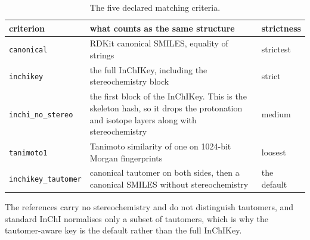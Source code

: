 \begin{table}[h]
\centering\small
\begin{threeparttable}
\caption{The five declared matching criteria.}
\label{tab:si-criteria}
\begin{tabular}{lp{7.2cm}l}
\toprule
criterion & what counts as the same structure & strictness \\
\midrule
\texttt{canonical} & RDKit canonical SMILES, equality of strings & strictest \\
\texttt{inchikey} & the full InChIKey, including the stereochemistry block & strict \\
\texttt{inchi\_no\_stereo} & the first block of the InChIKey. This is the skeleton hash, so it drops the protonation and isotope layers along with stereochemistry & medium \\
\texttt{tanimoto1} & Tanimoto similarity of one on 1024-bit Morgan fingerprints & loosest \\
\texttt{inchikey\_tautomer} & canonical tautomer on both sides, then a canonical SMILES without stereochemistry & the default \\
\bottomrule
\end{tabular}
\begin{tablenotes}[flushleft]\footnotesize
\item The references carry no stereochemistry and do not distinguish tautomers, and standard InChI normalises only a subset of tautomers, which is why the tautomer-aware key is the default rather than the full InChIKey.
\end{tablenotes}
\end{threeparttable}
\end{table}
